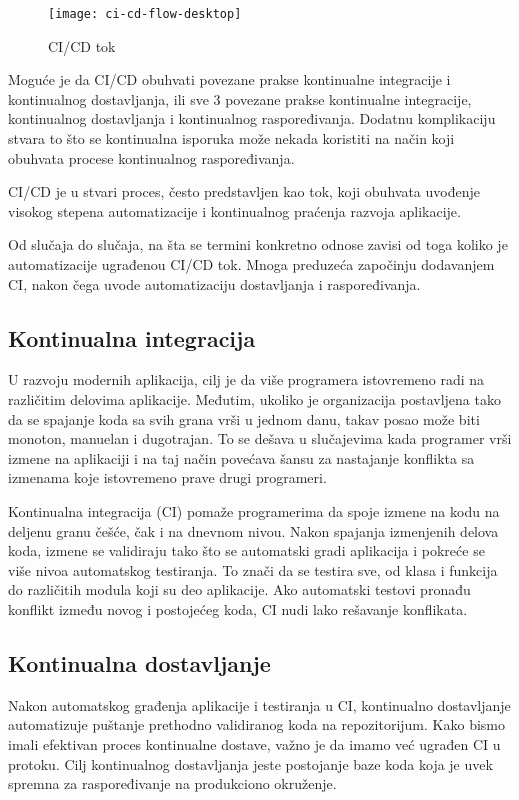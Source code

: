 \begin{figure}[h]
    \centering
    \texttt{[image: ci-cd-flow-desktop]}
    \caption{CI/CD tok}
\end{figure}

Moguće je da CI/CD obuhvati povezane prakse kontinualne integracije i kontinualnog dostavljanja, 
ili sve 3 povezane prakse kontinualne integracije, kontinualnog dostavljanja i kontinualnog 
raspoređivanja. Dodatnu komplikaciju stvara to što se kontinualna isporuka može nekada koristiti 
na način koji obuhvata procese kontinualnog raspoređivanja.

CI/CD je u stvari proces, često predstavljen kao tok, koji obuhvata uvođenje visokog stepena 
automatizacije i kontinualnog praćenja razvoja aplikacije.

Od slučaja do slučaja, na šta se termini konkretno odnose zavisi od toga koliko je automatizacije 
ugrađenou CI/CD tok. Mnoga preduzeća započinju dodavanjem CI, nakon čega uvode automatizaciju 
dostavljanja i raspoređivanja.

\subsection{Kontinualna integracija}
U razvoju modernih aplikacija, cilj je da više programera istovremeno radi na različitim delovima 
aplikacije. Međutim, ukoliko je organizacija postavljena tako da se spajanje koda sa svih grana 
vrši u jednom danu, takav posao može biti monoton, manuelan i dugotrajan. To se dešava u slučajevima 
kada programer vrši izmene na aplikaciji i na taj način povećava šansu za nastajanje konflikta sa 
izmenama koje istovremeno prave drugi programeri.

Kontinualna integracija (CI) pomaže programerima da spoje izmene na kodu na deljenu granu češće, 
čak i na dnevnom nivou. Nakon spajanja izmenjenih delova koda, izmene se validiraju tako što se 
automatski gradi aplikacija i pokreće se više nivoa automatskog testiranja. To znači da se testira 
sve, od klasa i funkcija do različitih modula koji su deo aplikacije. Ako automatski testovi pronađu 
konflikt između novog i postojećeg koda, CI nudi lako rešavanje konflikata.

\subsection{Kontinualna dostavljanje}
Nakon automatskog građenja aplikacije i testiranja u CI, kontinualno dostavljanje automatizuje 
puštanje prethodno validiranog koda na repozitorijum. Kako bismo imali efektivan proces kontinualne 
dostave, važno je da imamo već ugrađen CI u protoku. Cilj kontinualnog dostavljanja jeste postojanje 
baze koda koja je uvek spremna za raspoređivanje na produkciono okruženje.

